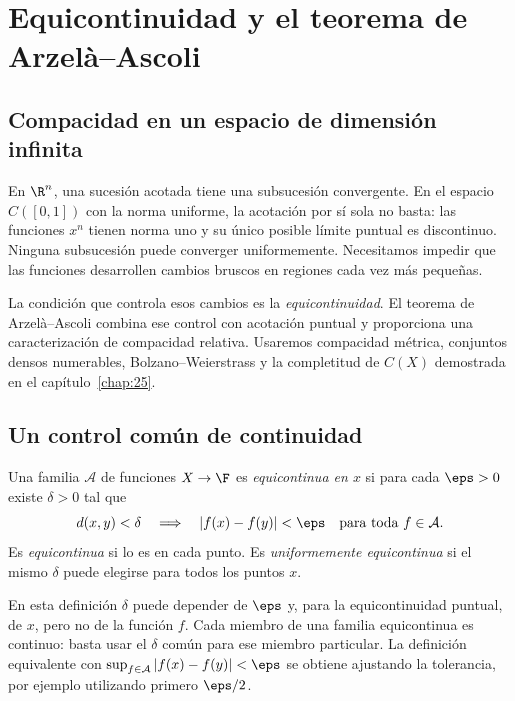\chapter{Equicontinuidad y el teorema de Arzelà--Ascoli}\label{chap:27}

\section{Compacidad en un espacio de dimensión infinita}
En $\R^n$, una sucesión acotada tiene una subsucesión convergente. En el espacio $C([0,1])$ con la norma uniforme, la acotación por sí sola no basta: las funciones $x^n$ tienen norma uno y su único posible límite puntual es discontinuo. Ninguna subsucesión puede converger uniformemente. Necesitamos impedir que las funciones desarrollen cambios bruscos en regiones cada vez más pequeñas.

La condición que controla esos cambios es la \emph{equicontinuidad}. El teorema de Arzelà--Ascoli combina ese control con acotación puntual y proporciona una caracterización de compacidad relativa. Usaremos compacidad métrica, conjuntos densos numerables, Bolzano--Weierstrass y la completitud de $C(X)$ demostrada en el capítulo~\ref{chap:25}.

\section{Un control común de continuidad}
\begin{definicion}
Una familia $\mathcal A$ de funciones $X\to\F$ es \emph{equicontinua en $x$} si para cada $\eps>0$ existe $\delta>0$ tal que
\[
 d(x,y)<\delta\quad\Longrightarrow\quad
 |f(x)-f(y)|<\eps\quad\text{para toda }f\in\mathcal A.
\]
Es \emph{equicontinua} si lo es en cada punto. Es \emph{uniformemente equicontinua} si el mismo $\delta$ puede elegirse para todos los puntos $x$.
\end{definicion}

En esta definición $\delta$ puede depender de $\eps$ y, para la equicontinuidad puntual, de $x$, pero no de la función $f$. Cada miembro de una familia equicontinua es continuo: basta usar el $\delta$ común para ese miembro particular. La definición equivalente con $\sup_{f\in\mathcal A}|f(x)-f(y)|<\eps$ se obtiene ajustando la tolerancia, por ejemplo utilizando primero $\eps/2$.

